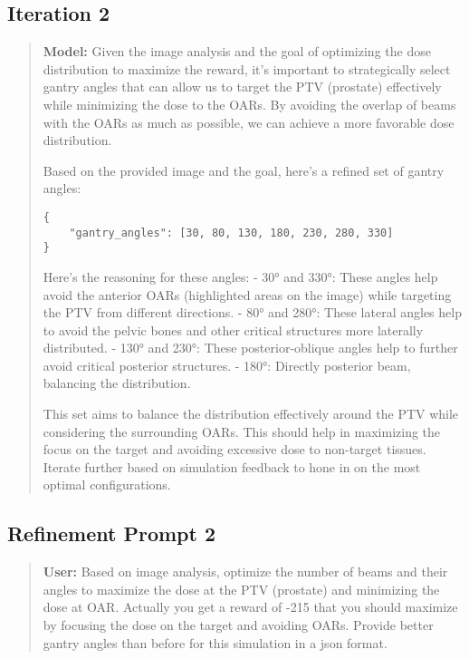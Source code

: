 \documentclass[runningheads]{llncs}
\begin{document}
\subsection*{Iteration 2}
\begin{quote}
\textbf{Model:} Given the image analysis and the goal of optimizing the dose distribution to maximize the reward, it's important to strategically select gantry angles that can allow us to target the PTV (prostate) effectively while minimizing the dose to the OARs. By avoiding the overlap of beams with the OARs as much as possible, we can achieve a more favorable dose distribution.

Based on the provided image and the goal, here’s a refined set of gantry angles:

\begin{verbatim}
{
    "gantry_angles": [30, 80, 130, 180, 230, 280, 330]
}
\end{verbatim}

Here’s the reasoning for these angles:
- 30° and 330°: These angles help avoid the anterior OARs (highlighted areas on the image) while targeting the PTV from different directions.
- 80° and 280°: These lateral angles help to avoid the pelvic bones and other critical structures more laterally distributed.
- 130° and 230°: These posterior-oblique angles help to further avoid critical posterior structures.
- 180°: Directly posterior beam, balancing the distribution.

This set aims to balance the distribution effectively around the PTV while considering the surrounding OARs. This should help in maximizing the focus on the target and avoiding excessive dose to non-target tissues. Iterate further based on simulation feedback to hone in on the most optimal configurations.
\end{quote}

\subsection*{Refinement Prompt 2}
\begin{quote}
\textbf{User:} Based on image analysis, optimize the number of beams and their angles to maximize the dose at the PTV (prostate) and minimizing the dose at OAR. Actually you get a reward of -215 that you should maximize by focusing the dose on the target and avoiding OARs. Provide better gantry angles than before for this simulation in a json format.
\end{quote}
\end{document}
